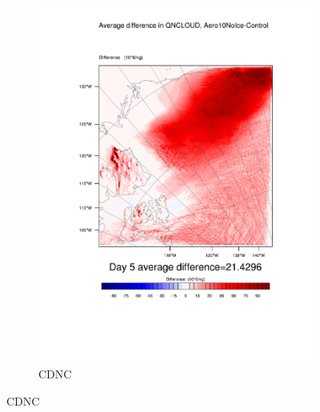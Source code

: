 \begin{figure}[hb]
\begin{subfigure}{0.48\textwidth}
		\includegraphics[width=\textwidth]{results/aero10ni/diff_Aero10NoIce_QNCLOUD_Day5.pdf}
		\caption{CDNC}
		\label{subfig:CDNCr4Day5}
	\end{subfigure}
	

\end{figure}
